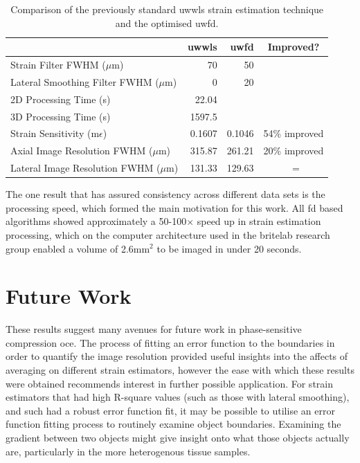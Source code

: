 \begin{table}
	\begin{tabularx}{\textwidth}{Yrrc}
		\toprule
		& \textbf{\ac{uwwls}} & \textbf{\ac{uwfd}} & \textbf{Improved?}\\
		\midrule 
		Strain Filter FWHM ($\mu$m) & 70 & 50 \\
		Lateral Smoothing Filter FWHM ($\mu$m) & 0 & 20 \\
		\midrule
		2D Processing Time (s) & 22.04 & \\
		3D Processing Time (s) & 1597.5 & \\
		Strain Sensitivity (m$\epsilon$) & 0.1607 & 0.1046 & 54\% improved \\
		Axial Image Resolution FWHM ($\mu$m) & 315.87 & 261.21 & 20\% improved \\
		Lateral Image Resolution FWHM ($\mu$m) & 131.33 & 129.63 & ~= \\
		\bottomrule
	\end{tabularx}
	\caption{Comparison of the previously standard \ac{uwwls} strain estimation technique and the optimised \ac{uwfd}.}
	\label{comparison_table}
\end{table}

The one result that has assured consistency across different data sets is the processing speed, which formed the main motivation for this work. All \ac{fd} based algorithms showed approximately a 50-100$\times$ speed up in strain estimation processing, which on the computer architecture used in the \ac{britelab} research group enabled a volume of 2.6$\text{mm}^2$ to be imaged in under 20 seconds.

\section{Future Work}

These results suggest many avenues for future work in phase-sensitive compression \ac{oce}. The process of fitting an error function to the boundaries in order to quantify the image resolution provided useful insights into the affects of averaging on different strain estimators, however the ease with which these results were obtained recommends interest in further possible application. For strain estimators that had high R-square values (such as those with lateral smoothing), and such had a robust error function fit, it may be possible to utilise an error function fitting process to routinely examine object boundaries. Examining the gradient between two objects might give insight onto what those objects actually are, particularly in the more heterogenous tissue samples. 

